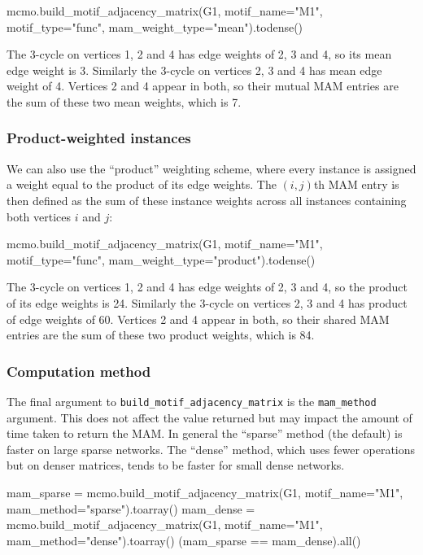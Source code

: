 \documentclass{article}
\begin{document}
\begin{pyconsole}
mcmo.build_motif_adjacency_matrix(G1, motif_name="M1",
  motif_type="func", mam_weight_type="mean").todense()
\end{pyconsole}

The 3-cycle on vertices 1, 2 and 4
has edge weights of 2, 3 and 4, so its mean edge weight is 3.
Similarly the 3-cycle on vertices 2, 3 and 4 has mean edge weight of 4.
Vertices 2 and 4 appear in both, so their mutual MAM entries are the
sum of these two mean weights, which is 7.

\subsubsection{Product-weighted instances}

We can also use the ``product'' weighting scheme,
where every instance is assigned a weight equal to the
product of its edge weights.
The $(i,j)$th MAM entry is then defined as the sum of these
instance weights across all instances containing
both vertices $i$ and $j$:

\begin{pyconsole}
mcmo.build_motif_adjacency_matrix(G1, motif_name="M1",
  motif_type="func", mam_weight_type="product").todense()
\end{pyconsole}

The 3-cycle on vertices 1, 2 and 4
has edge weights of 2, 3 and 4, so the product of its edge weights is 24.
Similarly the 3-cycle on vertices 2, 3 and 4 has product of edge weights of 60.
Vertices 2 and 4 appear in both, so their shared MAM entries are the
sum of these two product weights, which is 84.

\subsubsection{Computation method}

The final argument to \texttt{build\_motif\_adjacency\_matrix}
is the \texttt{mam\_method} argument.
This does not affect the value returned but may impact the
amount of time taken to return the MAM.
In general the ``sparse'' method (the default)
is faster on large sparse networks.
The ``dense'' method, which uses fewer operations but on
denser matrices, tends to be faster for small dense networks.


\begin{pyconsole}
mam_sparse = mcmo.build_motif_adjacency_matrix(G1, motif_name="M1",
  mam_method="sparse").toarray()
mam_dense  = mcmo.build_motif_adjacency_matrix(G1, motif_name="M1",
  mam_method="dense").toarray()
(mam_sparse == mam_dense).all()
\end{pyconsole}
\end{document}
